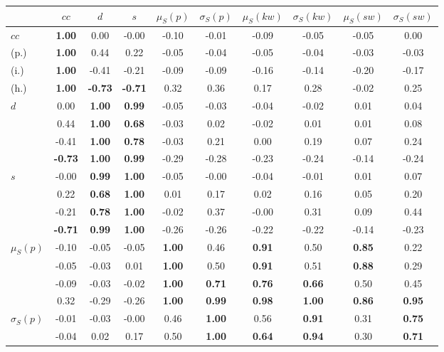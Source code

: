 \begin{table*}[h!]
\begin{center}
\begin{tabular}{| l || c | c | c | c | c | c | c | c | c |}\hline
 & $cc$ & $d$ & $s$ & $\mu_S(p)$ & $\sigma_S(p)$ & $\mu_S(kw)$ & $\sigma_S(kw)$ & $\mu_S(sw)$ & $\sigma_S(sw)$ \\\hline\hline
$cc$ & {\bf 1.00} & 0.00 & -0.00 & -0.10 & -0.01 & -0.09 & -0.05 & -0.05 & 0.00 \\
(p.) & {\bf 1.00} & 0.44 & 0.22 & -0.05 & -0.04 & -0.05 & -0.04 & -0.03 & -0.03 \\
(i.) & {\bf 1.00} & -0.41 & -0.21 & -0.09 & -0.09 & -0.16 & -0.14 & -0.20 & -0.17 \\
(h.) & {\bf 1.00} & {\bf -0.73} & {\bf -0.71} & 0.32 & 0.36 & 0.17 & 0.28 & -0.02 & 0.25 \\\hline
$d$ & 0.00 & {\bf 1.00} & {\bf 0.99} & -0.05 & -0.03 & -0.04 & -0.02 & 0.01 & 0.04 \\
 & 0.44 & {\bf 1.00} & {\bf 0.68} & -0.03 & 0.02 & -0.02 & 0.01 & 0.01 & 0.08 \\
 & -0.41 & {\bf 1.00} & {\bf 0.78} & -0.03 & 0.21 & 0.00 & 0.19 & 0.07 & 0.24 \\
 & {\bf -0.73} & {\bf 1.00} & {\bf 0.99} & -0.29 & -0.28 & -0.23 & -0.24 & -0.14 & -0.24 \\\hline
$s$ & -0.00 & {\bf 0.99} & {\bf 1.00} & -0.05 & -0.00 & -0.04 & -0.01 & 0.01 & 0.07 \\
 & 0.22 & {\bf 0.68} & {\bf 1.00} & 0.01 & 0.17 & 0.02 & 0.16 & 0.05 & 0.20 \\
 & -0.21 & {\bf 0.78} & {\bf 1.00} & -0.02 & 0.37 & -0.00 & 0.31 & 0.09 & 0.44 \\
 & {\bf -0.71} & {\bf 0.99} & {\bf 1.00} & -0.26 & -0.26 & -0.22 & -0.22 & -0.14 & -0.23 \\\hline
$\mu_S(p)$ & -0.10 & -0.05 & -0.05 & {\bf 1.00} & 0.46 & {\bf 0.91} & 0.50 & {\bf 0.85} & 0.22 \\
 & -0.05 & -0.03 & 0.01 & {\bf 1.00} & 0.50 & {\bf 0.91} & 0.51 & {\bf 0.88} & 0.29 \\
 & -0.09 & -0.03 & -0.02 & {\bf 1.00} & {\bf 0.71} & {\bf 0.76} & {\bf 0.66} & 0.50 & 0.45 \\
 & 0.32 & -0.29 & -0.26 & {\bf 1.00} & {\bf 0.99} & {\bf 0.98} & {\bf 1.00} & {\bf 0.86} & {\bf 0.95} \\\hline
$\sigma_S(p)$ & -0.01 & -0.03 & -0.00 & 0.46 & {\bf 1.00} & 0.56 & {\bf 0.91} & 0.31 & {\bf 0.75} \\
 & -0.04 & 0.02 & 0.17 & 0.50 & {\bf 1.00} & {\bf 0.64} & {\bf 0.94} & 0.30 & {\bf 0.71} \\

\end{tabular}
\end{center}
\end{table*}
